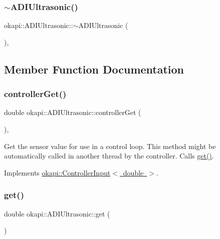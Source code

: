 \subsubsection{\texorpdfstring{$\sim$ADIUltrasonic()}{~ADIUltrasonic()}}
{\footnotesize\ttfamily okapi\+::\+A\+D\+I\+Ultrasonic\+::$\sim$\+A\+D\+I\+Ultrasonic (\begin{DoxyParamCaption}{ }\end{DoxyParamCaption})\hspace{0.3cm}{\ttfamily [virtual]}, {\ttfamily [default]}}



\subsection{Member Function Documentation}
\mbox{\label{classokapi_1_1ADIUltrasonic_a1ba1e2c1b71dba82c762ba941fe811c0}} 
\subsubsection{\texorpdfstring{controllerGet()}{controllerGet()}}
{\footnotesize\ttfamily double okapi\+::\+A\+D\+I\+Ultrasonic\+::controller\+Get (\begin{DoxyParamCaption}{ }\end{DoxyParamCaption})\hspace{0.3cm}{\ttfamily [override]}, {\ttfamily [virtual]}}

Get the sensor value for use in a control loop. This method might be automatically called in another thread by the controller. Calls \mbox{\hyperlink{classokapi_1_1ADIUltrasonic_ac2447e1f1d415ee48989f9fa9d85560e}{get()}}. 

Implements \mbox{\hyperlink{classokapi_1_1ControllerInput_a3c6c86d897983f367928a93890551e17}{okapi\+::\+Controller\+Input$<$ double $>$}}.

\mbox{\label{classokapi_1_1ADIUltrasonic_ac2447e1f1d415ee48989f9fa9d85560e}} 
\subsubsection{\texorpdfstring{get()}{get()}}
{\footnotesize\ttfamily double okapi\+::\+A\+D\+I\+Ultrasonic\+::get (\begin{DoxyParamCaption}{ }\end{DoxyParamCaption})\hspace{0.3cm}{\ttfamily [virtual]}}

